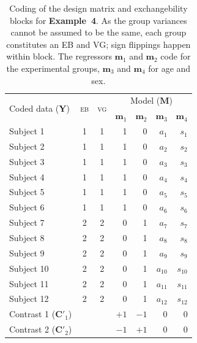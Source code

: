 \begin{table}[!t]
\caption[Coding for Example 4]{Coding of the design matrix and exchangebility blocks for \textbf{Example~4}. As the group variances cannot be assumed to be the same, each group constitutes an EB and VG; sign flippings happen within block. The regressors $\mathbf{m}_1$ and $\mathbf{m}_2$ code for the experimental groups, $\mathbf{m}_3$ and $\mathbf{m}_4$ for age and sex.}
\begin{center}
{\small
\begin{tabular}{@{}lccrrrr@{}}
\toprule
\multirow{2}{*}{\vspace*{-1.7mm}Coded data ($\mathbf{Y}$)} & \multirow{2}{*}{\vspace*{-1.7mm}\textsc{eb}} & \multirow{2}{*}{\vspace*{-1.7mm}\textsc{vg}} & \multicolumn{4}{c}{Model ($\mathbf{M}$)\hspace*{-3mm}}\\
\cmidrule(l){4-7}
& & & $\mathbf{m}_1$ & $\mathbf{m}_2$ & $\mathbf{m}_3$ & $\mathbf{m}_4$\\
\midrule
Subject 1   & 1 & 1 & 1 & 0 & $a_{1}$  & $s_{1}$\\
Subject 2   & 1 & 1 & 1 & 0 & $a_{2}$  & $s_{2}$\\
Subject 3   & 1 & 1 & 1 & 0 & $a_{3}$  & $s_{3}$\\
Subject 4   & 1 & 1 & 1 & 0 & $a_{4}$  & $s_{4}$\\
Subject 5   & 1 & 1 & 1 & 0 & $a_{5}$  & $s_{5}$\\
Subject 6   & 1 & 1 & 1 & 0 & $a_{6}$  & $s_{6}$\\
Subject 7   & 2 & 2 & 0 & 1 & $a_{7}$  & $s_{7}$\\
Subject 8   & 2 & 2 & 0 & 1 & $a_{8}$  & $s_{8}$\\
Subject 9   & 2 & 2 & 0 & 1 & $a_{9}$  & $s_{9}$\\
Subject 10  & 2 & 2 & 0 & 1 & $a_{10}$ & $s_{10}$\\
Subject 11  & 2 & 2 & 0 & 1 & $a_{11}$ & $s_{11}$\\
Subject 12  & 2 & 2 & 0 & 1 & $a_{12}$ & $s_{12}$\\
\midrule
Contrast 1 ($\mathbf{C}'_1$) & & & $+1$ & $-1$ & 0 & 0\\
Contrast 2 ($\mathbf{C}'_2$) & & & $-1$ & $+1$ & 0 & 0\\
\bottomrule
\end{tabular}}
\end{center}
\label{tab:perm:ex_behrensfisher}
\end{table}

